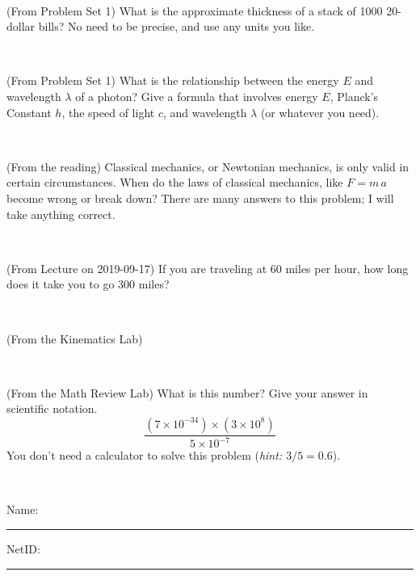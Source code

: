 \documentclass[12pt, letterpaper]{article}
\begin{document}
\vfill ~

\begin{problem} (From Problem Set 1)
What is the approximate thickness of a stack of 1000 20-dollar bills?
No need to be precise, and use any units you like.
\end{problem}


\vfill ~

\begin{problem} (From Problem Set 1)
What is the relationship between the energy $E$ and wavelength
$\lambda$ of a photon? Give a formula that involves energy $E$,
Planck's Constant $h$, the speed of light $c$, and wavelength
$\lambda$ (or whatever you need).
\end{problem}

\vfill ~


\clearpage


\begin{problem} (From the reading)
Classical mechanics, or Newtonian mechanics, is only valid in certain
circumstances. When do the laws of classical mechanics, like $F =
m\,a$ become wrong or break down? There are many answers to this
problem; I will take anything correct.
\end{problem}


\vfill ~

\begin{problem} (From Lecture on 2019-09-17)
If you are traveling at 60 miles per hour, how long does
it take you to go 300 miles?
\end{problem}


\vfill ~

\begin{problem} (From the Kinematics Lab)

\end{problem}


\vfill ~

\begin{problem} (From the Math Review Lab)
What is this number? Give your answer in scientific notation.
$$
\frac{(7\times10^{-34})\times(3\times10^8)}{5\times10^{-7}}
$$
You don't need a calculator to solve this problem (\textit{hint: $3/5=0.6$}).
\end{problem}


\vfill ~


\cleardoublepage



\noindent
Name: \rule[-1ex]{0.60\textwidth}{0.1pt}
NetID: \rule[-1ex]{0.20\textwidth}{0.1pt}
\end{document}
